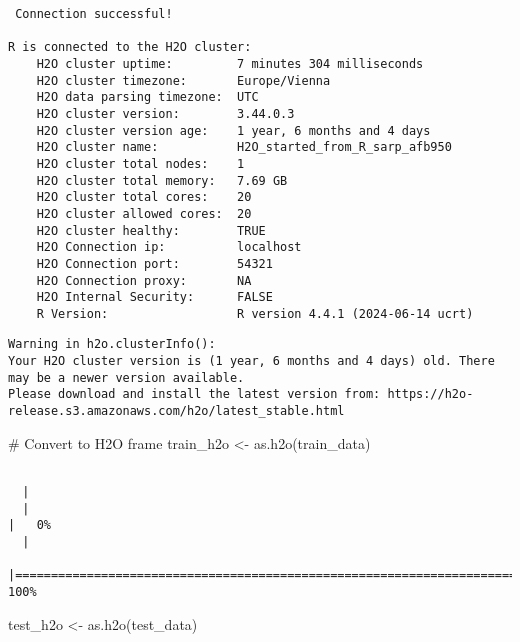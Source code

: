 \documentclass[
  11pt,
  letterpaper,
  DIV=11,
  numbers=noendperiod]{scrartcl}
\newenvironment{Shaded}{}{}
\newcommand{\CommentTok}[1]{\textcolor[rgb]{0.42,0.45,0.49}{#1}}
\newcommand{\FunctionTok}[1]{\textcolor[rgb]{0.44,0.26,0.76}{#1}}
\newcommand{\NormalTok}[1]{\textcolor[rgb]{0.14,0.16,0.18}{#1}}
\newcommand{\OtherTok}[1]{\textcolor[rgb]{0.44,0.26,0.76}{#1}}
\begin{document}
\begin{verbatim}
 Connection successful!

R is connected to the H2O cluster: 
    H2O cluster uptime:         7 minutes 304 milliseconds 
    H2O cluster timezone:       Europe/Vienna 
    H2O data parsing timezone:  UTC 
    H2O cluster version:        3.44.0.3 
    H2O cluster version age:    1 year, 6 months and 4 days 
    H2O cluster name:           H2O_started_from_R_sarp_afb950 
    H2O cluster total nodes:    1 
    H2O cluster total memory:   7.69 GB 
    H2O cluster total cores:    20 
    H2O cluster allowed cores:  20 
    H2O cluster healthy:        TRUE 
    H2O Connection ip:          localhost 
    H2O Connection port:        54321 
    H2O Connection proxy:       NA 
    H2O Internal Security:      FALSE 
    R Version:                  R version 4.4.1 (2024-06-14 ucrt) 
\end{verbatim}

\begin{verbatim}
Warning in h2o.clusterInfo(): 
Your H2O cluster version is (1 year, 6 months and 4 days) old. There may be a newer version available.
Please download and install the latest version from: https://h2o-release.s3.amazonaws.com/h2o/latest_stable.html
\end{verbatim}

\begin{Shaded}
\begin{Highlighting}[]
\CommentTok{\# Convert to H2O frame}
\NormalTok{train\_h2o }\OtherTok{\textless{}{-}} \FunctionTok{as.h2o}\NormalTok{(train\_data)}
\end{Highlighting}
\end{Shaded}

\begin{verbatim}

  |                                                                            
  |                                                                      |   0%
  |                                                                            
  |======================================================================| 100%
\end{verbatim}

\begin{Shaded}
\begin{Highlighting}[]
\NormalTok{test\_h2o }\OtherTok{\textless{}{-}} \FunctionTok{as.h2o}\NormalTok{(test\_data)}
\end{Highlighting}
\end{Shaded}
\end{document}
